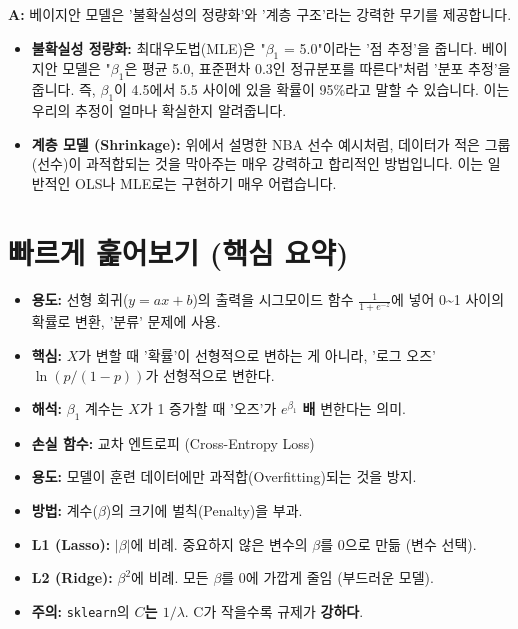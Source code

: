 \documentclass[11pt,a4paper]{book}
\theoremstyle{definition}
\begin{document}
\begin{tcolorbox}[breakable, title={Q: 베이지안 모델은 복잡한데 왜 굳이 사용하나요?}]
\textbf{A:} 베이지안 모델은 '불확실성의 정량화'와 '계층 구조'라는 강력한 무기를 제공합니다.
\begin{itemize}
    \item \textbf{불확실성 정량화:} 최대우도법(MLE)은 "$\beta_1$ = 5.0"이라는 '점 추정'을 줍니다. 베이지안 모델은 "$\beta_1$은 평균 5.0, 표준편차 0.3인 정규분포를 따른다"처럼 '분포 추정'을 줍니다. 즉, $\beta_1$이 4.5에서 5.5 사이에 있을 확률이 95\%라고 말할 수 있습니다. 이는 우리의 추정이 얼마나 확실한지 알려줍니다.
    \item \textbf{계층 모델 (Shrinkage):} 위에서 설명한 NBA 선수 예시처럼, 데이터가 적은 그룹(선수)이 과적합되는 것을 막아주는 매우 강력하고 합리적인 방법입니다. 이는 일반적인 OLS나 MLE로는 구현하기 매우 어렵습니다.
\end{itemize}
\end{tcolorbox}


\section{빠르게 훑어보기 (핵심 요약)}

\begin{tcolorbox}[breakable, title={로지스틱 회귀 (Logistic Regression)}]
\begin{itemize}
    \item \textbf{용도:} 선형 회귀($y=ax+b$)의 출력을 시그모이드 함수 $\frac{1}{1+e^{-z}}$에 넣어 0\textasciitilde1 사이의 확률로 변환, '분류' 문제에 사용.
    \item \textbf{핵심:} $X$가 변할 때 '확률'이 선형적으로 변하는 게 아니라, '로그 오즈' $\ln(p/(1-p))$가 선형적으로 변한다.
    \item \textbf{해석:} $\beta_1$ 계수는 $X$가 1 증가할 때 '오즈'가 $e^{\beta_1}$ \textbf{배} 변한다는 의미.
    \item \textbf{손실 함수:} 교차 엔트로피 (Cross-Entropy Loss)
\end{itemize}
\end{tcolorbox}

\begin{tcolorbox}[breakable, title={정규화 (Regularization)}]
\begin{itemize}
    \item \textbf{용도:} 모델이 훈련 데이터에만 과적합(Overfitting)되는 것을 방지.
    \item \textbf{방법:} 계수($\beta$)의 크기에 벌칙(Penalty)을 부과.
    \item \textbf{L1 (Lasso):} $|\beta|$에 비례. 중요하지 않은 변수의 $\beta$를 0으로 만듦 (변수 선택).
    \item \textbf{L2 (Ridge):} $\beta^2$에 비례. 모든 $\beta$를 0에 가깝게 줄임 (부드러운 모델).
    \item \textbf{주의:} \texttt{sklearn}의 \textbf{$C$는 $1/\lambda$}. C가 작을수록 규제가 \textbf{강하다}.
\end{itemize}
\end{tcolorbox}
\end{document}
